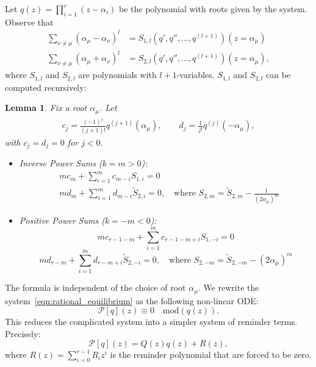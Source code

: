 \documentclass[11pt]{amsart}
\newtheorem{lemma}[theorem]{Lemma}
\theoremstyle{remark}
\numberwithin{equation}{section}
\begin{document}
Let $q(z) = \prod_{i=1}^r (z- \alpha_i)$ be the polynomial with roots given by the system. 
Observe that 
\[
\begin{split}
    \sum_{\nu \neq \mu} (\alpha_\mu-\alpha_\nu)^l &= S_{1,l}(q',q'', \dots, q^{(l+1)}) (z = \alpha_\mu)
    \\
    \sum_{\nu \neq \mu} (\alpha_\mu + \alpha_\nu)^l &= S_{2,l}(q', q'',\dots,q^{(l+1)}) (z=\alpha_\mu),
\end{split}
\]
where $S_{1,l}$ and $S_{2,l}$ are polynomials with $l+1$-variables. $S_{1,l}$ and $S_{2,l}$ can be computed recursively:
\begin{lemma} Fix a root $\alpha_\mu$. Let 
\[
\begin{split}
c_j = \frac{(-1)^j}{(j+1)!} q^{(j+1)}(\alpha_\mu), \qquad
d_j = \frac{1}{j!} q^{(j)}(-\alpha_\mu), 
\end{split}
\]
with $c_j = d_j =0$ for $j<0$. 
\begin{itemize}
\item Inverse Power Sums ($k = m > 0$):
\[
\begin{split}
& m c_m + \sum_{i=1}^m c_{m-i} S_{1,i} = 0
\\
& m d_m + \sum_{i=1}^m d_{m-i} \tilde{S}_{2,i} = 0, \quad \text{where } S_{2,m} = \tilde{S}_{2,m} - \frac{1}{(2\alpha_\mu)^m}
\end{split}
\]
\item Positive Power Sums ($k = -m < 0$):$$m c_{r-1-m} + \sum_{i=1}^m c_{r-1-m+i} S_{1,-i} = 0$$$$m d_{r-m} + \sum_{i=1}^m d_{r-m+i} \tilde{S}_{2,-i} = 0, \quad \text{where } S_{2,-m} = \tilde{S}_{2,-m} - (2\alpha_\mu)^m$$    
\end{itemize}
\end{lemma}


The formula is independent of the choice of root $\alpha_\mu$. We rewrite the system~\eqref{eqn:rational_equilibrium} as the following non-linear ODE:
\[
    \mathcal{P}[q](z) \equiv 0 \quad \text{mod}(q(z)). 
\]
This reduces the complicated system into a simpler system of reminder terms. Precisely:
\[
    \mathcal{P}[q](z) = Q(z) q(z) + R(z),
\]
where $R(z) = \sum_{i=0}^{r-1} R_i z^i$ is the reminder polynomial that are forced to be zero.
\end{document}
